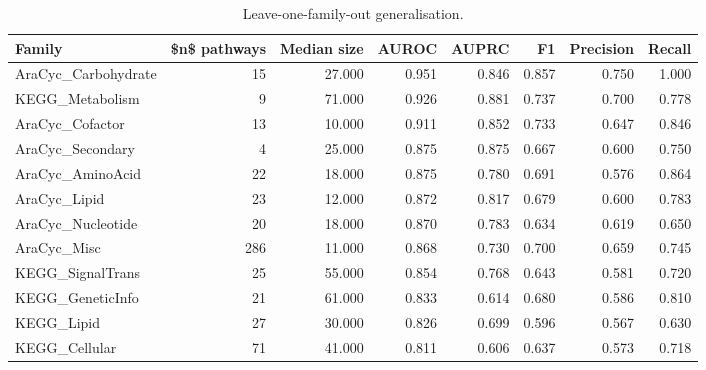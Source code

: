 \begin{table}[htbp]
\centering
\caption{Leave-one-family-out generalisation.}
\label{tab:lofo_recomputed}
\begin{tabular}{lrrrrrrr}
\toprule
Family & \$n\$ pathways & Median size & AUROC & AUPRC & F1 & Precision & Recall \\
\midrule
AraCyc\_Carbohydrate & 15 & 27.000 & 0.951 & 0.846 & 0.857 & 0.750 & 1.000 \\
KEGG\_Metabolism & 9 & 71.000 & 0.926 & 0.881 & 0.737 & 0.700 & 0.778 \\
AraCyc\_Cofactor & 13 & 10.000 & 0.911 & 0.852 & 0.733 & 0.647 & 0.846 \\
AraCyc\_Secondary & 4 & 25.000 & 0.875 & 0.875 & 0.667 & 0.600 & 0.750 \\
AraCyc\_AminoAcid & 22 & 18.000 & 0.875 & 0.780 & 0.691 & 0.576 & 0.864 \\
AraCyc\_Lipid & 23 & 12.000 & 0.872 & 0.817 & 0.679 & 0.600 & 0.783 \\
AraCyc\_Nucleotide & 20 & 18.000 & 0.870 & 0.783 & 0.634 & 0.619 & 0.650 \\
AraCyc\_Misc & 286 & 11.000 & 0.868 & 0.730 & 0.700 & 0.659 & 0.745 \\
KEGG\_SignalTrans & 25 & 55.000 & 0.854 & 0.768 & 0.643 & 0.581 & 0.720 \\
KEGG\_GeneticInfo & 21 & 61.000 & 0.833 & 0.614 & 0.680 & 0.586 & 0.810 \\
KEGG\_Lipid & 27 & 30.000 & 0.826 & 0.699 & 0.596 & 0.567 & 0.630 \\
KEGG\_Cellular & 71 & 41.000 & 0.811 & 0.606 & 0.637 & 0.573 & 0.718 \\
\bottomrule
\end{tabular}

\end{table}

